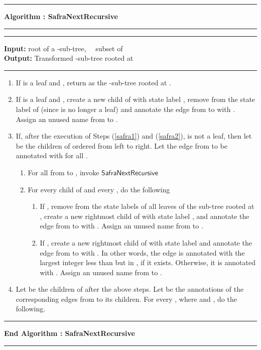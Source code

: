 \documentclass[3p]{elsarticle}
\newcommand{\algo}[1]{\ensuremath{\textsf{{#1}}}}
\newcommand{\algoblock}[4]{{{{
                                     \vspace{5mm}
                                     \hrule 
				     \vspace{2mm} 
                                     \noindent \textsf{\bfseries Algorithm : {#1}}
				     \vspace{2mm} 
                                     \hrule 
				     \vspace{2mm}
                                     \hrule 
				     \vspace{2mm}
                                     \noindent \textsf{ {\bfseries Input:} {#2}}\\
                                     \noindent \textsf{ {\bfseries Output:} {#3}}
				     \vspace{2mm}
				     \hrule
				     \vspace{2mm}
{#4} 
				     \vspace{2mm}
				     \hrule
				     \vspace{2mm}
                                     \noindent \textsf{\bfseries End Algorithm : {#1}}}
				     \vspace{2mm}
                                     \hrule 
				     \vspace{2mm}
                          }}
                         }
\begin{document}
\algoblock{SafraNextRecursive}
{ root of a -sub-tree,~~  subset of }
{ Transformed -sub-tree rooted at }
{
  \begin{enumerate}
  \item \label{safra1} If  is a leaf and ,
    return  as the -sub-tree rooted at .
    
  \item \label{safra2} If  is a leaf and , create a
    new child  of  with state label , remove  from
    the state label of  (since  is no longer a leaf) and annotate the
    edge from  to  with .  Assign an unused name 
    from  to .
    
  \item \label{safra3} If, after the execution of Steps (\ref{safra1})
    and (\ref{safra2}),  is not a leaf, then let 
    be the children of  ordered from left to right.  Let the edge
    from  to  be annotated with  for all .
    
    \begin{enumerate}
      
    \item \label{safra3a} For all  from  to , invoke
      \algo{SafraNextRecursive}
      
    \item \label{safra3b} For every child  of  and every , do the following
      \begin{enumerate}
        
      \item \label{safra3b1} If , remove  from the
        state labels of all leaves of the sub-tree rooted at , create a
        new rightmost child  of  with state label , and
        annotate the edge from  to  with .  Assign an
        unused name from 
        to .
        
      \item \label{safra3b2} If , create a new
        rightmost child  of  with state label  and annotate
        the edge from  to  with .  In other words, the edge is
        annotated with the largest integer less than  but in ,
        if it exists.  Otherwise, it is annotated with .  Assign an
        unused name from 
        to .
        
      \end{enumerate}
      
    \end{enumerate}
    
  \item \label{safra4} Let  be the children
    of  after the above steps.  Let  be
    the annotations of the corresponding edges from  to its children.
    For every , where 
    and , do the following.
    \begin{enumerate}
      

\end{enumerate}
\end{enumerate}}
\end{document}
